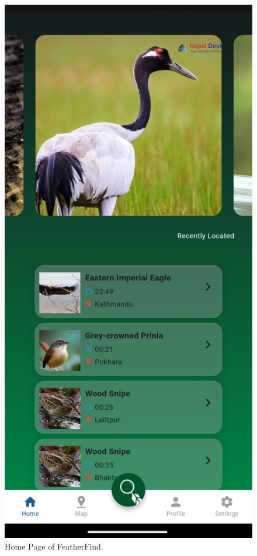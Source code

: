 \begin{figure}[h!]
    \centering
    \includegraphics[scale=0.4]{images/Homepage.jpg}
    \caption{Home Page of FeatherFind.}
\end{figure}
